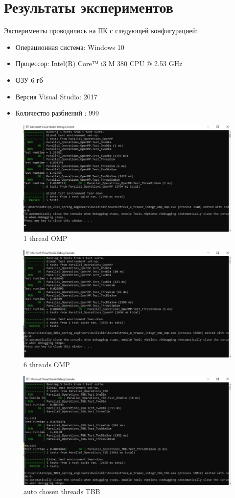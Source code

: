 \documentclass{report}
\begin{document}
\part{Результаты экспериментов}
Эксперименты проводились на ПК с следующей конфигурацией:
\begin{itemize}
\item Операционная система: Windows 10
\item Процессор: Intel(R) Core™ i3 M 380 CPU @ 2.53 GHz
\item ОЗУ 6 гб
\item Версия Visual Studio: 2017
\item Количество разбиений : 999
\end{itemize}
\begin{figure}[ht]
\includegraphics[scale=0.6]
{bur_img/ph1.jpg}
\caption{1 thread OMP}
\end{figure}
\begin{figure}[ht]
\includegraphics[scale=0.6]
{bur_img/ph6.jpg}
\caption{6 threads OMP}
\end{figure}
\begin{figure}[ht]
\includegraphics[scale=0.6]
{bur_img/phtbb.jpg}
\caption{auto chosen threads TBB}
\end{figure}
\end{document}
